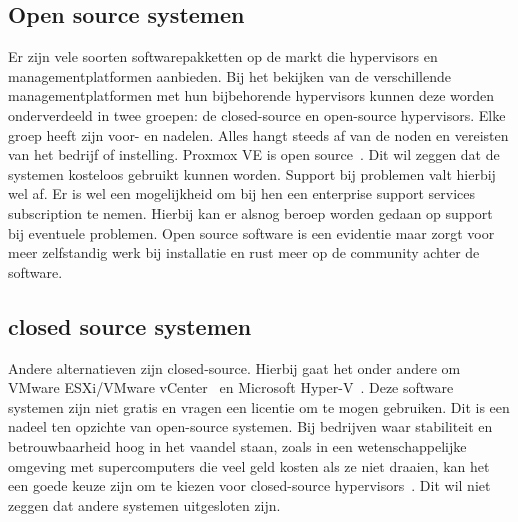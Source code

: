 \subsection{Open source systemen}
Er zijn vele soorten softwarepakketten op de markt die hypervisors en managementplatformen aanbieden. Bij het bekijken van de verschillende managementplatformen met hun bijbehorende hypervisors kunnen deze worden onderverdeeld in twee groepen: de closed-source en open-source hypervisors. Elke groep heeft zijn voor- en nadelen. Alles hangt steeds af van de noden en vereisten van het bedrijf of instelling.
Proxmox VE is open source~\autocite{Proxmox}. Dit wil zeggen dat de systemen kosteloos gebruikt kunnen worden. Support bij problemen valt hierbij wel af. Er is wel een mogelijkheid om bij hen een enterprise support services subscription te nemen. Hierbij kan er alsnog beroep worden gedaan op support bij eventuele problemen.
Open source software is een evidentie maar zorgt voor meer zelfstandig werk bij installatie en rust meer op de community achter de software.

\subsection{closed source systemen}
Andere alternatieven zijn closed-source. Hierbij gaat het onder andere om VMware ESXi/VMware vCenter~\autocite{vmware} en Microsoft Hyper-V~\autocite{Eaton2019}. Deze software systemen zijn niet gratis en vragen een licentie om te mogen gebruiken. Dit is een nadeel ten opzichte van open-source systemen.
Bij bedrijven waar stabiliteit en betrouwbaarheid hoog in het vaandel staan, zoals in een wetenschappelijke omgeving met supercomputers die veel geld kosten als ze niet draaien, kan het een goede keuze zijn om te kiezen voor closed-source hypervisors~\autocite{voras2012early}. Dit wil niet zeggen dat andere systemen uitgesloten zijn.
